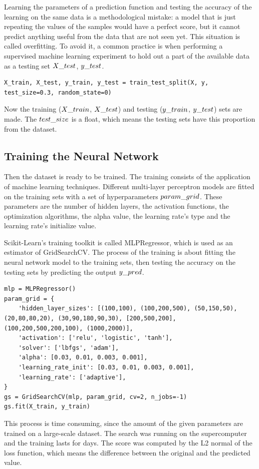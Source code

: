 Learning the parameters of a prediction function and testing the accuracy of the learning on the same data is a methodological mistake: a model that is just repeating the values of the samples would have a perfect score, but it cannot predict anything useful from the data that are not seen yet. This situation is called overfitting. To avoid it, a common practice is when performing a supervised machine learning experiment to hold out a part of the available data as a testing set $X\char`_test$, $y\char`_test$. 
\begin{lstlisting}
X_train, X_test, y_train, y_test = train_test_split(X, y, test_size=0.3, random_state=0)
\end{lstlisting}
Now the training ($X\char`_train$, $X\char`_test$) and testing ($y\char`_train$, $y\char`_test$) sets are made. The $test\char`_size$ is a float, which means the testing sets have this proportion from the dataset.



\subsection{Training the Neural Network}

Then the dataset is ready to be trained. The training consists of the application of machine learning techniques. Different multi-layer perceptron models are fitted on the training sets with a set of hyperparameters $param\char`_grid$. These parameters are the number of hidden layers, the activation functions, the optimization algorithms, the alpha value, the learning rate's type and the learning rate's initialize value. \medskip

Scikit-Learn's training toolkit is called MLPRegressor, which is used as an estimator of GridSearchCV. The process of the training is about fitting the neural network model to the training sets, then testing the accuracy on the testing sets by predicting the output $y\char`_pred$.  

\newpage

\begin{lstlisting}
mlp = MLPRegressor()
param_grid = {
	'hidden_layer_sizes': [(100,100), (100,200,500), (50,150,50), (20,80,80,20), (30,90,180,90,30), [200,500,200], (100,200,500,200,100), (1000,2000)],
	'activation': ['relu', 'logistic', 'tanh'],
	'solver': ['lbfgs', 'adam'],
	'alpha': [0.03, 0.01, 0.003, 0.001],
	'learning_rate_init': [0.03, 0.01, 0.003, 0.001],
	'learning_rate': ['adaptive'],
}
gs = GridSearchCV(mlp, param_grid, cv=2, n_jobs=-1)
gs.fit(X_train, y_train)
\end{lstlisting}
This process is time consuming, since the amount of the given parameters are trained on a large-scale dataset. The search was running on the supercomputer and the training lasts for days. The score was computed by the L2 normal of the loss function, which means the difference between the original and the predicted value. \smallskip

